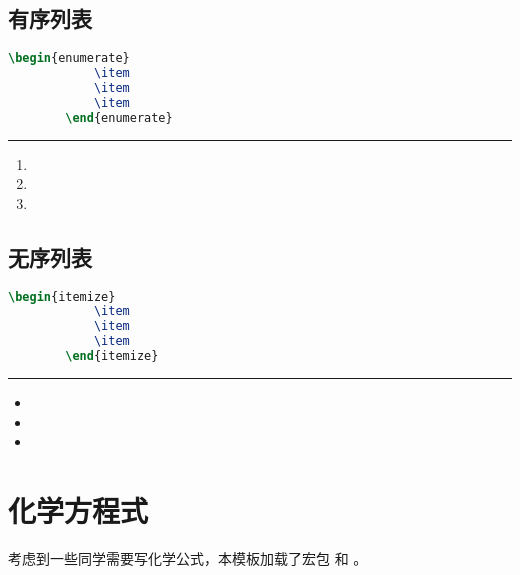 \subsection{有序列表}
\begin{minipage}[t]{0.48\textwidth}
	\begin{lstlisting}[language=TeX]
		\begin{enumerate}
			\item 
			\item 
			\item 
		\end{enumerate}
	\end{lstlisting} 
\end{minipage}
\begin{minipage}[t]{0.48\textwidth}
	\rule[-10pt]{10cm}{0em}
	\begin{enumerate}
		\item 
		\item 
		\item 
	\end{enumerate}
\end{minipage}
\subsection{无序列表}
\begin{minipage}[t]{0.48\textwidth}
	\begin{lstlisting}[language=TeX]
		\begin{itemize}
			\item 
			\item 
			\item 
		\end{itemize}
	\end{lstlisting} 
\end{minipage}
\begin{minipage}[t]{0.48\textwidth}
	\rule[-10pt]{10cm}{0em}
	\begin{itemize}
		\item 
		\item 
		\item 
	\end{itemize}
\end{minipage}

\section{化学方程式}
考虑到一些同学需要写化学公式，本模板加载了宏包   和 。 

